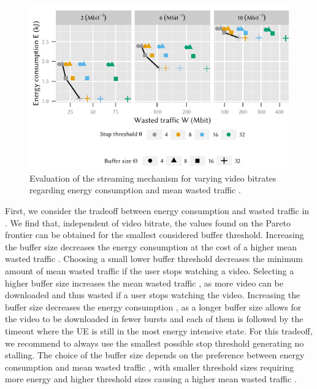 \begin{figure}
  \centering
  \includegraphics{application/lte_video/trade_offs/figures/energy2lostData}
  \caption{Evaluation of the streaming mechanism for varying video bitrates regarding energy consumption \energyconsumption and mean wasted traffic \meanwastedtraffic.}
  \label{fig:application:lte_video:numerical_evaluation:trade_offs:energy2lostData}
\end{figure}


First, we consider the tradeoff between energy consumption \energyconsumption and wasted traffic in .
We find that, independent of video bitrate, the values found on the Pareto frontier can be obtained for the smallest considered buffer threshold.
Increasing the buffer size decreases the energy consumption \energyconsumption at the cost of a higher mean wasted traffic \meanwastedtraffic.
Choosing a small lower buffer threshold \bufferlower decreases the minimum amount of mean wasted traffic \meanwastedtraffic if the user stops watching a video.
Selecting a higher buffer size \buffersize  increases the mean wasted traffic \meanwastedtraffic, as more video can be downloaded and thus wasted if a user stops watching the video.
Increasing the buffer size \buffersize decreases the energy consumption \energyconsumption, as a longer buffer size allows for the video to be downloaded in fewer bursts and each of them is followed by the \tidle timeout where the \gls{UE} is still in the most energy intensive \rrcconnected state.
For this tradeoff, we recommend to always use the smallest possible stop threshold generating no stalling.
The choice of the buffer size depends on the preference between energy consumption \energyconsumption and mean wasted traffic \meanwastedtraffic, with smaller threshold sizes requiring more energy and higher threshold sizes causing a higher mean wasted traffic \meanwastedtraffic.

